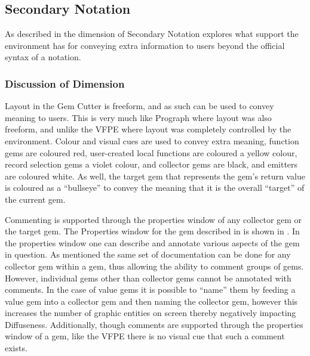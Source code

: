 
\subsection{Secondary Notation}

As described in  the dimension of Secondary Notation explores what support the environment has for conveying extra information to users beyond the official syntax of a notation.

\subsubsection{Discussion of Dimension}

Layout in the Gem Cutter is freeform, and as such can be used to convey meaning to users.  This is very much like Prograph where layout was also freeform, and unlike the VFPE where layout was completely controlled by the environment.  Colour and visual cues are used to convey extra meaning, function gems are coloured red, user-created local functions are coloured a yellow colour, record selection gems a violet colour, and collector gems are black, and emitters are coloured white.  As well, the target gem that represents the gem's return value is coloured as a ``bullseye'' to convey the meaning that it is the overall ``target'' of the current gem.

Commenting is supported through the properties window of any collector gem or the target gem.  The Properties window for the  gem described in  is shown in .  In the properties window one can describe and annotate various aspects of the gem in question.  As mentioned the same set of documentation can be done for any collector gem within a gem, thus allowing the ability to comment groups of gems.  However, individual gems other than collector gems cannot be annotated with comments.  In the case of value gems it is possible to ``name'' them by feeding a value gem into a collector gem and then naming the collector gem, however this increases the number of graphic entities on screen thereby negatively impacting Diffuseness.  Additionally, though comments are supported through the properties window of a gem, like the VFPE there is no visual cue that such a comment exists.


